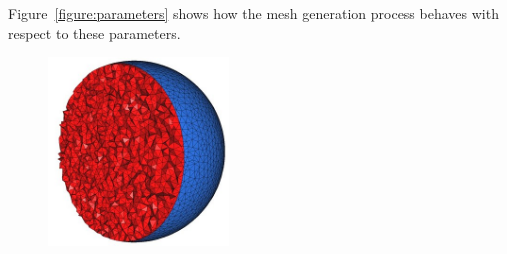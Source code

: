 Figure~\ref{figure:parameters} shows how the mesh generation process
behaves with respect to these parameters.

\begin{figure}[ht]
\begin{center}
 \begin{ccTexOnly}
   \includegraphics[height=5cm]{Mesh_3/pictures/implicit_domain}


\end{ccTexOnly}
\end{center}
\end{figure}
